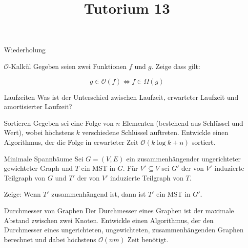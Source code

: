 
\title[Algorithmen I SS 14]{Tutorium 13}

\usepackage{alltt}




\begin{frame}
  \maketitle
\end{frame}

\begin{frame}
	\begin{center}
		\Huge
		Wiederholung
	\end{center}
\end{frame}

\begin{frame}{$\mathcal{O}$-Kalkül}
	Gegeben seien zwei Funktionen $f$ und $g$. Zeige dass gilt:

	$$ g \in \mathcal{O}(f) \Leftrightarrow f \in \Omega(g)$$
\end{frame}

\begin{frame}{Laufzeiten}
	Was ist der Unterschied zwischen Laufzeit, erwarteter Laufzeit und amortisierter Laufzeit?
\end{frame}

\begin{frame}{Sortieren}
	Gegeben sei eine Folge von $n$ Elementen (bestehend aus Schlüssel und Wert), wobei höchstens $k$ verschiedene Schlüssel auftreten.
	Entwickle einen Algorithmus, der die Folge in erwarteter Zeit $\mathcal{O}(k \log{k} + n)$ sortiert.
\end{frame}

\begin{frame}{Minimale Spannbäume}
	Sei $G = (V, E)$ ein zusammenhängender ungerichteter gewichteter Graph und $T$ ein MST in $G$.
	Für $V' \subseteq V$ sei $G'$ der von $V'$ induzierte Teilgraph von $G$ und $T'$ der von $V'$ induzierte Teilgraph von $T$.

	Zeige: Wenn $T'$ zusammenhängend ist, dann ist $T'$ ein MST in $G'$.
\end{frame}

\begin{frame}{Durchmesser von Graphen}
	Der Durchmesser eines Graphen ist der maximale Abstand zwischen zwei Knoten.
Entwickle einen Algorithmus, der den Durchmesser eines ungerichteten, ungewichteten, zusammenhängenden Graphen berechnet und dabei höchstens $\mathcal{O}(n m)$ Zeit benötigt.
\end{frame}

